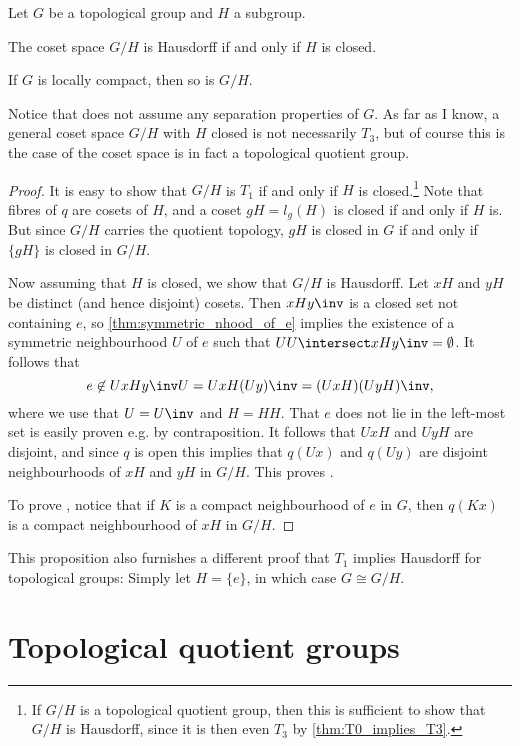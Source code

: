\documentclass[article, a4paper, 11pt, oneside]{memoir}
\numberwithin{equation}{chapter}
\begin{document}
\begin{proposition}
    Let $G$ be a topological group and $H$ a subgroup.
    \begin{enumprop}
        \item \label{enum:coset_space_hausdorff} The coset space $G/H$ is Hausdorff if and only if $H$ is closed.
        
        \item \label{enum:coset_space_locally_compact} If $G$ is locally compact\footnotemark, then so is $G/H$.
    \end{enumprop}
\end{proposition}
%
Notice that  does not assume any separation properties of $G$. As far as I know, a general coset space $G/H$ with $H$ closed is not necessarily $T_3$, but of course this is the case of the coset space is in fact a topological quotient group.

\begin{proof}
    It is easy to show that $G/H$ is $T_1$ if and only if $H$ is closed.\footnote{If $G/H$ is a topological quotient group, then this is sufficient to show that $G/H$ is Hausdorff, since it is then even $T_3$ by \cref{thm:T0_implies_T3}.} Note that fibres of $q$ are cosets of $H$, and a coset $gH = l_g(H)$ is closed if and only if $H$ is. But since $G/H$ carries the quotient topology, $gH$ is closed in $G$ if and only if $\{gH\}$ is closed in $G/H$.

    Now assuming that $H$ is closed, we show that $G/H$ is Hausdorff. Let $xH$ and $yH$ be distinct (and hence disjoint) cosets. Then $xHy\inv$ is a closed set not containing $e$, so \cref{thm:symmetric_nhood_of_e} implies the existence of a symmetric neighbourhood $U$ of $e$ such that $UU \intersect xHy\inv = \emptyset$. It follows that
    \begin{equation*}
        e
            \not\in U xHy\inv U
            = Ux H (Uy)\inv
            = (UxH)(UyH)\inv,
    \end{equation*}
    where we use that $U = U\inv$ and $H = HH$. That $e$ does not lie in the left-most set is easily proven e.g. by contraposition. It follows that $UxH$ and $UyH$ are disjoint, and since $q$ is open this implies that $q(Ux)$ and $q(Uy)$ are disjoint neighbourhoods of $xH$ and $yH$ in $G/H$. This proves .

    To prove , notice that if $K$ is a compact neighbourhood of $e$ in $G$, then $q(Kx)$ is a compact neighbourhood of $xH$ in $G/H$.
\end{proof}

This proposition also furnishes a different proof that $T_1$ implies Hausdorff for topological groups: Simply let $H = \{e\}$, in which case $G \cong G/H$.


\section{Topological quotient groups}


\nocite{*}

\printbibliography
\end{document}
